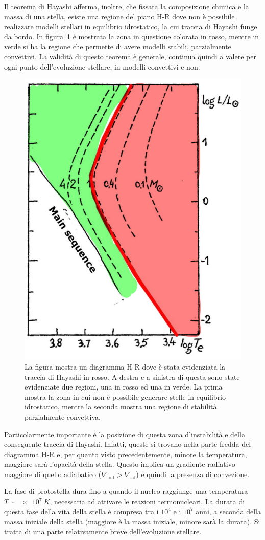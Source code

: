 Il teorema di Hayashi afferma, inoltre, che fissata la composizione chimica e la massa di una stella, esiste una regione del piano H-R dove non è possibile realizzare modelli stellari in equilibrio idrostatico, la cui traccia di Hayashi funge da bordo. In figura~\ref{fig:hay} è mostrata la zona in questione colorata in rosso, mentre in verde si ha la regione che permette di avere modelli stabili, parzialmente convettivi. La validità di questo teorema è generale,  continua quindi a valere per ogni punto dell'evoluzione stellare, in modelli convettivi e non.

\begin{figure}
    \centering
    \includegraphics[width = 0.3 \textwidth]{immagini/hayashi-1.png}
    \caption{La figura mostra un diagramma H-R dove è stata evidenziata la traccia di Hayashi in rosso. A destra e a sinistra di questa sono state evidenziate due regioni, una in rosso ed una in verde. La prima mostra la zona in cui non è possibile generare stelle in equilibrio idrostatico, mentre la seconda mostra una regione di stabilità parzialmente convettiva.}\label{fig:hay}
\end{figure}

Particolarmente importante è la posizione di questa zona d'instabilità e della conseguente traccia di Hayashi. Infatti, queste si trovano nella parte fredda del diagramma H-R e, per quanto visto precedentemente, minore la temperatura, maggiore sarà l'opacità della stella. Questo implica un gradiente radiativo maggiore di quello adiabatico ($\nabla_{\mbox{rad}} > \nabla_{\mbox{ad}}$) e quindi la presenza di convezione.

La fase di protostella dura fino a quando il nucleo raggiunge una temperatura $T \sim \SI{e7}{K}$, necessaria ad attivare le reazioni termonucleari. La durata di questa fase della vita della stella è compresa tra i $10^4$ e i $10^7$ anni, a seconda della massa iniziale della stella (maggiore è la massa iniziale, minore sarà la durata). Si tratta di una parte relativamente breve dell'evoluzione stellare.